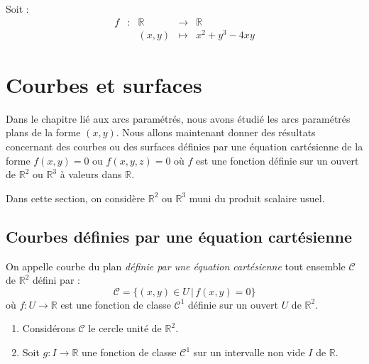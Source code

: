 \documentclass[french,11pt,twoside]{VcCours}
\begin{document}
\begin{Exemple}{} Soit :
$$\begin{array}{cccll}
f& : & \mathbb{R} & \rightarrow & \mathbb{R} \\
& & (x,y) & \mapsto & x^2+y^3-4xy 
\end{array}$$

\vspace*{5cm}
\end{Exemple}

\section{Courbes et surfaces}
Dans le chapitre lié aux arcs paramétrés, nous avons étudié les arcs paramétrés plans de la forme $(x,y)$. Nous allons maintenant donner des résultats concernant des courbes ou des surfaces définies par une équation cartésienne de la forme $f(x,y)=0$ ou $f(x,y,z)=0$ où $f$ est une fonction définie sur un ouvert de $\mathbb{R}^2$ ou $\mathbb{R}^3$ à valeurs dans $\mathbb{R}$.

\medskip

Dans cette section, on considère $\mathbb{R}^2$ ou $\mathbb{R}^3$ muni du produit scalaire usuel.

\subsection{Courbes définies par une équation cartésienne}
\medskip

On appelle courbe du plan \emph{définie par une équation cartésienne} tout ensemble $\mathcal{C}$ de $\mathbb{R}^2$ défini par :
$$ \mathcal{C} = \lbrace (x,y) \in U \, \vert \, f(x,y)=0 \rbrace$$
où $f : U \rightarrow \mathbb{R}$ est une fonction de classe $\mathcal{C}^1$ définie sur un ouvert $U$ de $\mathbb{R}^2$.

\medskip

\begin{Exemples}{}
\begin{enumerate}
\item Considérons $\mathcal{C}$ le cercle unité de $\mathbb{R}^2$.

\vspace*{5cm}
\item Soit $g : I \rightarrow \mathbb{R}$ une fonction de classe $\mathcal{C}^1$ sur un intervalle non vide $I$ de $\mathbb{R}$.

\newpage
\end{enumerate}
\end{Exemples}
\end{document}
